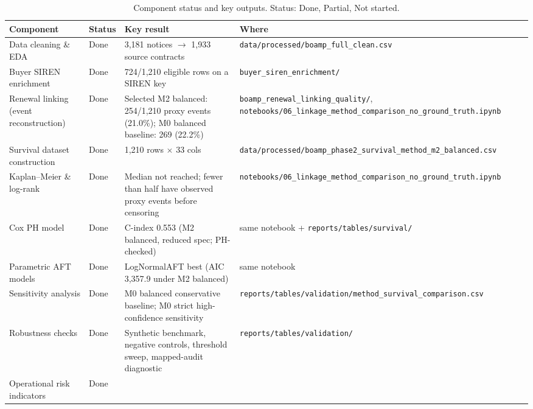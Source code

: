 \documentclass[11pt,a4paper]{article}
\begin{document}
\begin{landscape}
\begin{table}[p]
\centering
\caption{Component status and key outputs. Status: \textcolor{done}{Done},
\textcolor{partial}{Partial}, \textcolor{notdone}{Not started}.}
\label{tab:pipeline}
\scriptsize
\begin{tabular}{@{}p{4.2cm}p{1.6cm}p{5.4cm}p{10.0cm}@{}}
\toprule
\textbf{Component} & \textbf{Status} & \textbf{Key result} & \textbf{Where} \\
\midrule
Data cleaning \& EDA
  & \textcolor{done}{Done}
  & 3,181 notices $\to$ 1,933 source contracts
  & \nolinkurl{data/processed/boamp_full_clean.csv} \\[3pt]
Buyer SIREN enrichment
  & \textcolor{done}{Done}
  & 724/1,210 eligible rows on a SIREN key
  & \nolinkurl{buyer_siren_enrichment/} \\[3pt]
Renewal linking (event reconstruction)
  & \textcolor{done}{Done}
  & Selected M2 balanced: 254/1,210 proxy events (21.0\%); M0 balanced baseline: 269 (22.2\%)
  & \nolinkurl{boamp_renewal_linking_quality/}, \nolinkurl{notebooks/06_linkage_method_comparison_no_ground_truth.ipynb} \\[3pt]
Survival dataset construction
  & \textcolor{done}{Done}
  & 1,210 rows $\times$ 33 cols
  & \nolinkurl{data/processed/boamp_phase2_survival_method_m2_balanced.csv} \\[3pt]
Kaplan--Meier \& log-rank
  & \textcolor{done}{Done}
  & Median not reached; fewer than half have observed proxy events before censoring
  & \nolinkurl{notebooks/06_linkage_method_comparison_no_ground_truth.ipynb} \\[3pt]
Cox PH model
  & \textcolor{done}{Done}
  & C-index 0.553 (M2 balanced, reduced spec; PH-checked)
  & same notebook + \nolinkurl{reports/tables/survival/} \\[3pt]
Parametric AFT models
  & \textcolor{done}{Done}
  & LogNormalAFT best (AIC 3,357.9 under M2 balanced)
  & same notebook \\[3pt]
Sensitivity analysis
  & \textcolor{done}{Done}
  & M0 balanced conservative baseline; M0 strict high-confidence sensitivity
  & \nolinkurl{reports/tables/validation/method_survival_comparison.csv} \\[3pt]
Robustness checks
  & \textcolor{done}{Done}
  & Synthetic benchmark, negative controls, threshold sweep, mapped-audit diagnostic
  & \nolinkurl{reports/tables/validation/} \\[3pt]
Operational risk indicators
  & \textcolor{done}{Done}

\end{tabular}
\end{table}
\end{landscape}
\end{document}
